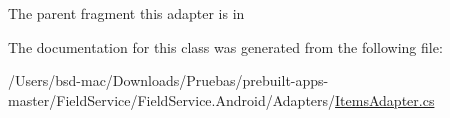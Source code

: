 The parent fragment this adapter is in 



The documentation for this class was generated from the following file\+:\begin{DoxyCompactItemize}
\item 
/\+Users/bsd-\/mac/\+Downloads/\+Pruebas/prebuilt-\/apps-\/master/\+Field\+Service/\+Field\+Service.\+Android/\+Adapters/\hyperlink{_items_adapter_8cs}{Items\+Adapter.\+cs}\end{DoxyCompactItemize}
